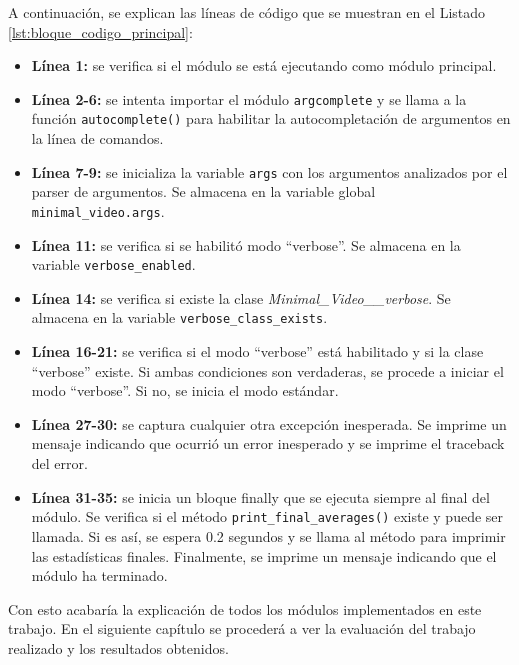 A continuación, se explican las líneas de código que se muestran en el Listado \ref{lst:bloque_codigo_principal}:
\begin{itemize}
    \item \textbf{Línea 1:} se verifica si el módulo se está ejecutando como módulo principal.
    \item \textbf{Línea 2-6:} se intenta importar el módulo \texttt{argcomplete} y se llama a la función \texttt{autocomplete()} para habilitar la autocompletación de argumentos en la línea de comandos.
    \item \textbf{Línea 7-9:} se inicializa la variable \texttt{args} con los argumentos analizados por el parser de argumentos. Se almacena en la variable global \texttt{minimal\_video.args}.
    \item \textbf{Línea 11:} se verifica si se habilitó modo ``verbose''. Se almacena en la variable \texttt{verbose\_enabled}.
    \item \textbf{Línea 14:} se verifica si existe la clase \textit{Minimal\_Video\_\_verbose}. Se almacena en la variable \texttt{verbose\_class\_exists}.
    \item \textbf{Línea 16-21:} se verifica si el modo ``verbose'' está habilitado y si la clase ``verbose'' existe. Si ambas condiciones son verdaderas, se procede a iniciar el modo ``verbose''. Si no, se inicia el modo estándar.
    \item \textbf{Línea 27-30:} se captura cualquier otra excepción inesperada. Se imprime un mensaje indicando que ocurrió un error inesperado y se imprime el traceback del error.
    \item \textbf{Línea 31-35:} se inicia un bloque finally que se ejecuta siempre al final del módulo. Se verifica si el método \texttt{print\_final\_averages()} existe y puede ser llamada. Si es así, se espera 0.2 segundos y se llama al método para imprimir las estadísticas finales. Finalmente, se imprime un mensaje indicando que el módulo ha terminado.
\end{itemize}
\vspace{\baselineskip}

Con esto acabaría la explicación de todos los módulos implementados en este trabajo. En el siguiente capítulo se procederá a ver la evaluación del trabajo realizado y los resultados obtenidos.
